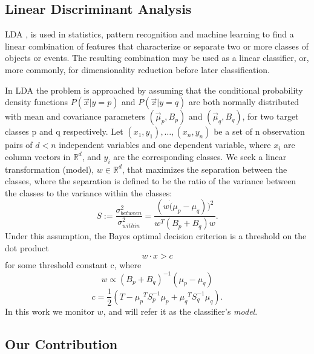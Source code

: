 \documentclass[11pt,twocolumn,varwidth=true,a4paper,fleqn]{article}
\begin{document}
\subsection{Linear Discriminant Analysis}
\par LDA \cite{fisher1936use}, is used in statistics, 
pattern recognition and machine learning to find a linear combination of features 
that characterize or separate two or more classes of objects or events. 
The resulting combination may be used as a linear classifier, or, 
more commonly, for dimensionality reduction before later classification.
\\\par In LDA the problem is approached by assuming that the conditional probability
density functions $P(\vec x|y=p)$ and $P(\vec x|y=q)$ are both normally distributed with 
mean and covariance parameters $\left(\vec \mu_p, B_p\right)$ and 
$\left(\vec \mu_q, B_q\right)$, for two target classes p and q respectively.
Let ${(x_1,y_1),\ldots,(x_n,y_n)}$ be a set of n observation pairs
of $d < n$ independent variables and one dependent variable,
where $x_i$ are column vectors in $\mathbb{R}^d$, and $y_i$ are the
corresponding classes. 
We seek a linear transformation (model), $w \in \mathbb{R}^d $,
that maximizes the separation between the classes, where the separation is
defined to be the ratio of the variance between the classes to the variance
within the classes:
\begin{equation*}
S := \frac{\sigma^2_{between}}{\sigma^2_{within}} = \frac{(w \dot (\mu_p -
\mu_q))^2}{w^T(B_p+B_q)w}.
\end{equation*}
Under this assumption, the Bayes optimal decision criterion is a threshold on the 
dot product
\begin{equation*} \label{eq:decision}
w \cdot x > c
\end{equation*}
for some threshold constant c, where
\begin{equation} \label{eq:w}
w \propto (B_p+B_q)^{-1}(\mu_p - \mu_q)
\end{equation}
\begin{equation} \label{eq:c}
c = \frac{1}{2}(T-{\mu_p}^T S_p^{-1} {\mu_p}+{\mu_q}^T S_q^{-1} {\mu_q}).
\end{equation}
In this work we monitor $w$, and will refer it as the
classifier's \textit{model}.
\subsection{Our Contribution}
\end{document}
